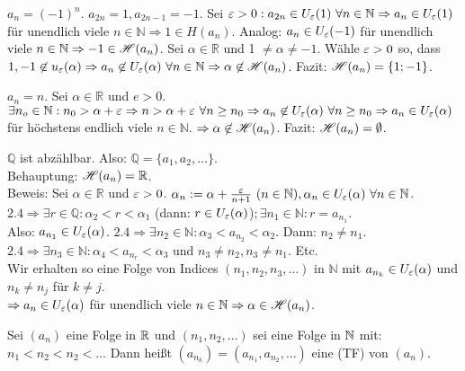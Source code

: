 \documentclass[a4paper,twoside,DIV15,BCOR12mm]{scrbook}
\begin{document}
\begin{beispiele}
\item $a_n = (-1)^n$. $a_{2n} = 1, a_{2n-1} = -1.$ 
Sei $\ep > 0: a_{2n} \in U_{\ep}(1)\ \forall n \in \mathbb{N} \Rightarrow a_n \in U_{\ep}(1)$ 
für unendlich viele $n \in \mathbb{N} \Rightarrow 1 \in H (a_n)$. 
Analog: $a_n \in U_{\varepsilon}(-1)$ für unendlich viele $n \in \mathbb{N} \Rightarrow -1 \in \mathscr{H}(a_n)$. 
Sei $\alpha \in \mathbb{R}$ und 1 $\neq \alpha \neq -1$. 
W\"{a}hle $\varepsilon > 0$ so, dass $1, -1 \not\in u_{\varepsilon}(\alpha) \Rightarrow a_n \not\in U_{\varepsilon}(\alpha)\ \forall n \in \mathbb{N} \Rightarrow \alpha \not\in \mathscr{H}(a_{n})$. 
Fazit: $\mathscr{H}(a_n) = \{1; -1\}$.
\item $a_n = n$. Sei $\alpha \in \mathbb{R}$ und $e > 0$. $\exists n_o \in \mathbb{N}: n_0 > \alpha + \varepsilon \Rightarrow n > \alpha + \varepsilon\ \forall n \geq n_0 \Rightarrow a_n \not\in U_{\varepsilon}(\alpha)\ \forall n \geq n_0 \Rightarrow a_n \in U_{\varepsilon}(\alpha)$ für h\"{o}chstens endlich viele $n \in \mathbb{N}$. $\Rightarrow \alpha \not\in \mathscr{H}(a_n)$. Fazit: $\mathscr{H}(a_n) = \emptyset$.
\item $\mathbb{Q}$ ist abz\"{a}hlbar. Also: $\mathbb{Q} = \{a_1, a_2, \ldots\}$.\\
Behauptung: $\mathscr{H}(a_n) = \mathbb{R}$. \\
Beweis: Sei $\alpha \in \mathbb{R}$ und $\varepsilon > 0$. $\alpha_n := \alpha + \frac{\varepsilon}{n + 1}\  (n \in \mathbb{N}), \alpha_n \in U_{\varepsilon}(\alpha)\ \forall n\in\mathbb{N}$. \\
$2.4 \Rightarrow \exists r \in \mathbb{Q}: \alpha_2 < r < \alpha_1 $ (dann: $r \in U_{\varepsilon}(\alpha)$)$; \exists n_1 \in \mathbb{N}: r = a_{n_1}$. \\
Also: $a_{n_1} \in U_{\varepsilon}(\alpha)$. $2.4 \Rightarrow \exists n_2 \in \mathbb{N}: \alpha_3 < a_{n_2} < \alpha_2$. Dann: $n_2 \neq n_1$. $2.4 \Rightarrow \exists n_3 \in \mathbb{N}: \alpha_4 < a_{n_r} < \alpha_3$ und $n_3 \neq n_2, n_3 \neq n_1$. Etc. \\
Wir erhalten so eine Folge von Indices $(n_1, n_2, n_3, \ldots)$ in $\mathbb{N}$ mit $a_{n_k} \in U_{\varepsilon}(\alpha)$ und $n_k \neq n_j$ f\"{u}r $k \neq j$.\\
$\Rightarrow a_n \in U_{\varepsilon}(\alpha)$ f\"{u}r unendlich viele $n \in \mathbb{N} \Rightarrow \alpha \in \mathscr{H}(a_n)$.
\end{beispiele}

\begin{definition}[Teilfolge]
Sei $(a_n)$ eine Folge in $\mathbb{R}$ und $(n_1,n_2,\ldots)$ sei eine Folge in $\mathbb{N}$ mit: $n_1<n_2<n_2<\ldots$ Dann heißt $(a_{n_k}) = (a_{n_1}, a_{n_2},\ldots)$ eine  (TF) von $(a_n)$.
\end{definition}
\end{document}
